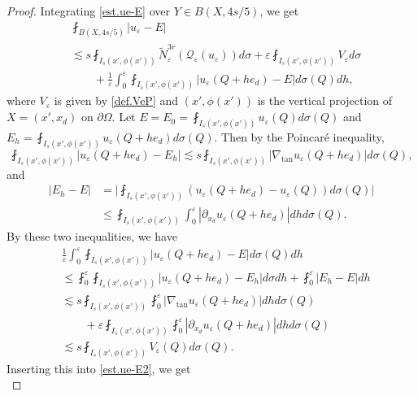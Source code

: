 \documentclass[reqno,12pt]{amsart} %
\theoremstyle{definition}
\theoremstyle{remark}
\numberwithin{equation}{section}
\newcommand{\Q}{\mathcal{Q}}
\newcommand{\e}{\varepsilon}
\begin{document}
\begin{proof}
Integrating \eqref{est.ue-E} over $Y \in B(X,4s/5)$, we get
\begin{equation}\label{est.ue-E2}
\begin{aligned}
    & \fint_{B(X,4s/5)} |u_\e - E| \\
    & \lesssim s \fint_{I_s(x',\phi(x'))} \widetilde{N}_\e^{3r}(\Q_\e(u_\e)) d\sigma + \e \fint_{I_s(x',\phi(x'))} V_\e d\sigma \\
    & \qquad +  \frac{1}{\e} \int_0^\e \fint_{I_s(x',\phi(x'))} |u_\e(Q + he_d) - E| d\sigma(Q) dh,
    \end{aligned}
\end{equation}
where $V_\e$ is given by \eqref{def.VeP} and $(x',\phi(x'))$ is the vertical projection of $X = (x',x_d)$ on $\partial \Omega$.
Let $E = E_0 = \fint_{I_s(x',\phi(x'))} u_\e(Q) d\sigma(Q)$ and $E_h = \fint_{I_s(x',\phi(x'))} u_\e(Q + he_d) d\sigma(Q)$. Then by the Poincar\'{e} inequality,
\begin{equation}
    \fint_{I_s(x',\phi(x'))} |u_\e(Q + he_d) - E_h| \lesssim s \fint_{I_s(x',\phi(x'))} |\nabla_{\tan} u_\e(Q + he_d) | d\sigma(Q), 
\end{equation}
and
\begin{equation}
\begin{aligned}
    |E_h - E| & = \bigg| \fint_{I_s(x',\phi(x'))} ( u_\e(Q + he_d) - u_\e(Q)) d\sigma(Q)\bigg| \\
        & \le \fint_{I_s(x',\phi(x'))} \int_0^\e |\partial_{x_d} u_\e(Q + he_d)| dh d\sigma(Q).
\end{aligned}
\end{equation}
By these two inequalities, we have
\begin{equation}
\begin{aligned}
    & \frac{1}{\e} \int_0^\e \fint_{I_s(x',\phi(x'))} |u_\e(Q + he_d) - E| d\sigma(Q) dh \\
    & \le \fint_0^\e \fint_{I_s(x',\phi(x'))} |u_\e(Q + he_d) - E_h| d\sigma dh + \fint_0^\e |E_h - E| dh \\
    & \lesssim  s \fint_{I_s(x',\phi(x'))} \fint_0^\e |\nabla_{\tan} u_\e(Q + he_d) | dh d\sigma(Q) \\
    & \qquad + \e \fint_{I_s(x',\phi(x'))} \fint_0^\e |\partial_{x_d} u_\e(Q + he_d)| dh d\sigma(Q) \\
    & \lesssim   s \fint_{I_s(x',\phi(x'))} V_\e(Q) d\sigma(Q).
\end{aligned}
\end{equation}
Inserting this into \eqref{est.ue-E2}, we get
\begin{equation}

\end{equation}
\end{proof}
\end{document}
